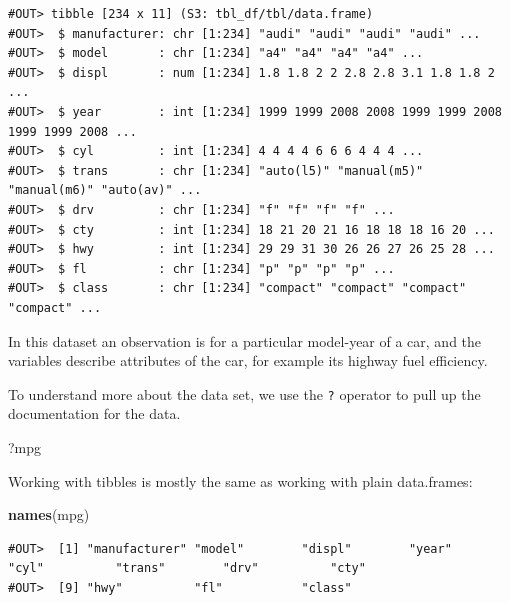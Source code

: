 \documentclass[]{book}
\newenvironment{Shaded}{\begin{snugshade}}{\end{snugshade}}
\newcommand{\KeywordTok}[1]{\textcolor[rgb]{0.13,0.29,0.53}{\textbf{#1}}}
\newcommand{\NormalTok}[1]{#1}
\newcommand{\OperatorTok}[1]{\textcolor[rgb]{0.81,0.36,0.00}{\textbf{#1}}}
\begin{document}
\begin{verbatim}
#OUT> tibble [234 x 11] (S3: tbl_df/tbl/data.frame)
#OUT>  $ manufacturer: chr [1:234] "audi" "audi" "audi" "audi" ...
#OUT>  $ model       : chr [1:234] "a4" "a4" "a4" "a4" ...
#OUT>  $ displ       : num [1:234] 1.8 1.8 2 2 2.8 2.8 3.1 1.8 1.8 2 ...
#OUT>  $ year        : int [1:234] 1999 1999 2008 2008 1999 1999 2008 1999 1999 2008 ...
#OUT>  $ cyl         : int [1:234] 4 4 4 4 6 6 6 4 4 4 ...
#OUT>  $ trans       : chr [1:234] "auto(l5)" "manual(m5)" "manual(m6)" "auto(av)" ...
#OUT>  $ drv         : chr [1:234] "f" "f" "f" "f" ...
#OUT>  $ cty         : int [1:234] 18 21 20 21 16 18 18 18 16 20 ...
#OUT>  $ hwy         : int [1:234] 29 29 31 30 26 26 27 26 25 28 ...
#OUT>  $ fl          : chr [1:234] "p" "p" "p" "p" ...
#OUT>  $ class       : chr [1:234] "compact" "compact" "compact" "compact" ...
\end{verbatim}

In this dataset an observation is for a particular model-year of a car, and the variables describe attributes of the car, for example its highway fuel efficiency.

To understand more about the data set, we use the \texttt{?} operator to pull up the documentation for the data.

\begin{Shaded}
\begin{Highlighting}[]
\NormalTok{?mpg}
\end{Highlighting}
\end{Shaded}

Working with tibbles is mostly the same as working with plain data.frames:

\begin{Shaded}
\begin{Highlighting}[]
\KeywordTok{names}\NormalTok{(mpg)}
\end{Highlighting}
\end{Shaded}

\begin{verbatim}
#OUT>  [1] "manufacturer" "model"        "displ"        "year"         "cyl"          "trans"        "drv"          "cty"         
#OUT>  [9] "hwy"          "fl"           "class"
\end{verbatim}

\begin{Shaded}
\end{Shaded}
\end{document}
